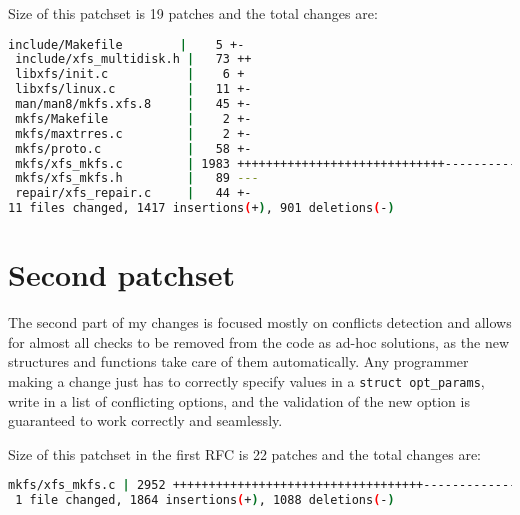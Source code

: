 Size of this patchset is 19 patches and the total changes are:
\begin{lstlisting}[frame=none, basicstyle=\footnotesize\ttfamily, language=Bash, numbers=none, numberstyle=\tiny\color{black},caption= {Git statistics for the first patchset~\cite{finalPatchset1}.}]
include/Makefile        |    5 +-
 include/xfs_multidisk.h |   73 ++
 libxfs/init.c           |    6 +
 libxfs/linux.c          |   11 +-
 man/man8/mkfs.xfs.8     |   45 +-
 mkfs/Makefile           |    2 +-
 mkfs/maxtrres.c         |    2 +-
 mkfs/proto.c            |   58 +-
 mkfs/xfs_mkfs.c         | 1983 +++++++++++++++++++++++++++++------------------
 mkfs/xfs_mkfs.h         |   89 ---
 repair/xfs_repair.c     |   44 +-
11 files changed, 1417 insertions(+), 901 deletions(-)
\end{lstlisting}


\section{Second patchset}\label{chap:refactoring:second}
The second part of my changes is focused mostly on conflicts detection and allows for almost all checks to be removed from the code as ad-hoc solutions, as the new structures and functions take care of them automatically. Any programmer making a change just has to correctly specify values in a {\tt struct opt\_params}, write in a list of conflicting options, and the validation of the new option is guaranteed to work correctly and seamlessly.

Size of this patchset in the first RFC is 22 patches and the total changes are:
\begin{lstlisting}[frame=none, basicstyle=\footnotesize\ttfamily, language=Bash, numbers=none, numberstyle=\tiny\color{black},caption= {Git statistics for the second patchset~\cite{secondSetRFC}.}]
 mkfs/xfs_mkfs.c | 2952 +++++++++++++++++++++++++++++++++++--------------------
 1 file changed, 1864 insertions(+), 1088 deletions(-)
\end{lstlisting}


